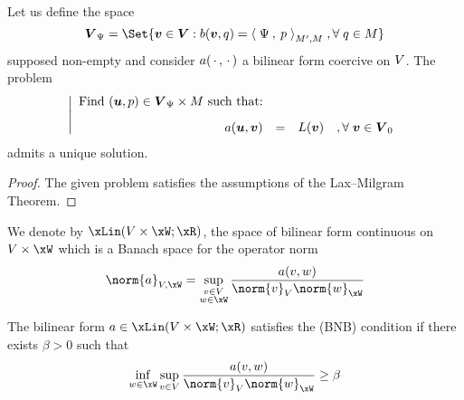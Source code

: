 \begin{thrm}
Let us define the space
\begin{equation*}
\xVd_\Psi = \Set{ \vv\in\xVd : b(\vv,q) = \DualP{\Psi}{p}_{\xM',\xM}\;,\forany q\in\xM }
\end{equation*}
supposed non-empty and consider $a(\,{\mathbf\cdot}\,,\,{\mathbf\cdot}\,)$ a bilinear form coercive on ${V}$.
The problem
\begin{equation*}
\left\vert
\begin{array}{rlll}
\mbox{Find $({{\boldsymbol u}},p)\in \boldsymbol{{V}}_\Psi\times{M}$ such that:}\\[2ex]
\displaystyle a({{\boldsymbol u}},{{\boldsymbol v}}) &=& L({{\boldsymbol v}})& ,{\forall\;}{{\boldsymbol v}}\in\boldsymbol{{V}}_{0}
\end{array}
\right.
\end{equation*}
admits a unique solution.
\end{thrm}
\begin{proof}
The given problem satisfies the assumptions of the Lax--Milgram Theorem.
\end{proof}

We denote by $\xLin(\xV\times\xW; \xR)$, the space of bilinear form continuous on $\xV\times\xW$ which is a Banach space for the operator norm
\begin{equation*}
\norm{a}_{\xV,\xW} = \sup_{\substack{v\in\xV\\w\in\xW}} \dfrac{a(v,w)}{\norm{v}_\xV \norm{w}_\xW}
\end{equation*}

\begin{prpstn}\label{prp:bnb}
The bilinear form $a \in \xLin(\xV\times\xW; \xR)$ satisfies the (BNB) condition if there exists $\beta > 0$ such that
\begin{equation*}
\inf_{w\in\xW} \sup_{v\in\xV} \dfrac{a(v,w)}{\norm{v}_\xV \norm{w}_\xW} \geq \beta
\end{equation*}
\end{prpstn}

